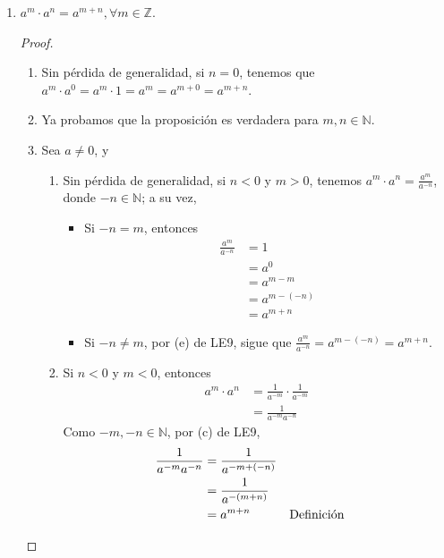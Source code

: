 \documentclass[11pt]{article}
\newcommand{\N}{\mathbb{N}}
\newcommand{\Z}{\mathbb{Z}}
\begin{document}
\begin{enumerate}[label=\alph*)]
  \item $a^m\cdot a^n = a^{m+n}, \forall m\in \Z$.
  \begin{proof}\leavevmode
  \begin{enumerate}[label=\Roman*)]
    \item Sin pérdida de generalidad, si $n=0$, tenemos que $a^m\cdot a^0 = a^m \cdot 1 = a^m = a^{m+0}=a^{m+n}$.
    \item Ya probamos que la proposición es verdadera para $m,n\in \N$.
    \item Sea $a\neq 0$, y \begin{enumerate}[label=\roman*)]
      \item Sin pérdida de generalidad, si $n<0$ y $m>0$, tenemos $a^m\cdot a^n = \frac{a^m}{a^{-n}}$, donde $-n\in \N$; a su vez, \begin{itemize}
        \item Si $-n = m$, entonces \begin{align*}
          \frac{a^m}{a^{-n}} &= 1 \\
          &= a^0\\
          &= a^{m-m}\\
          &= a^{m-(-n)}\\
          &= a^{m+n}
        \end{align*}
        \item Si $-n\neq m$, por (e) de LE9, sigue que $\frac{a^m}{a^{-n}} = a^{m-(-n)} = a^{m+n}$.
      \end{itemize}
      \item Si $n<0$ y $m<0$, entonces \begin{align*}
        a^m\cdot a^n &= \frac{1}{a^{-m}} \cdot \frac{1}{a^{-m}}\\
        &= \frac{1}{a^{-m}a^{-n}}
      \end{align*}
      Como $-m, -n\in \N$, por (c) de LE9, \begin{align*}
        \frac{1}{a^{-m}a^{-n}} &= \frac{1}{a^{-m+(-n)}}\\
        &= \frac{1}{a^{-(m+n)}}\\
        &= a^{m+n} && \text{Definición} \qedhere
      \end{align*}
    \end{enumerate}
  \end{enumerate}
  \end{proof}


\end{enumerate}
\end{document}
